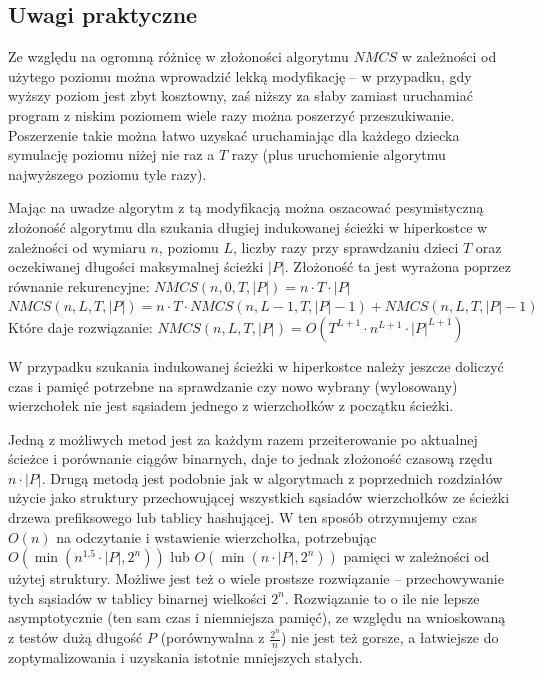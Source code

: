 \documentclass{pracamgr}
\begin{document}
    \subsection{Uwagi praktyczne}
     Ze względu na ogromną różnicę w złożoności algorytmu $NMCS$ w zależności od użytego poziomu można wprowadzić lekką modyfikację -- w przypadku,
     gdy wyższy poziom jest zbyt kosztowny, zaś niższy za słaby zamiast uruchamiać program z niskim poziomem wiele razy można poszerzyć przeszukiwanie.
     Poszerzenie takie można łatwo uzyskać uruchamiając dla każdego dziecka symulację poziomu niżej nie raz a $T$ razy
     (plus uruchomienie algorytmu najwyższego poziomu tyle razy).
     
     Mając na uwadze algorytm z tą modyfikacją można oszacować pesymistyczną złożoność algorytmu dla szukania długiej indukowanej ścieżki w hiperkostce
     w zależności od wymiaru $n$, poziomu $L$, liczby razy przy sprawdzaniu dzieci $T$ oraz oczekiwanej długości maksymalnej ścieżki $|P|$.
     Złożoność ta jest wyrażona poprzez równanie rekurencyjne:\newline
     $NMCS(n,0,T,|P|)=n\cdot T\cdot |P|$\newline
     $NMCS(n,L,T,|P|)=n\cdot T\cdot NMCS(n,L-1,T,|P|-1)+NMCS(n,L,T,|P|-1)$\newline
     Które daje rozwiązanie:\newline
     $NMCS(n,L,T,|P|)=O(T^{L+1}\cdot n^{L+1}\cdot|P|^{L+1})$     
     
     W przypadku szukania indukowanej ścieżki w hiperkostce należy jeszcze doliczyć czas i pamięć potrzebne na sprawdzanie czy nowo wybrany (wylosowany)
     wierzchołek nie jest sąsiadem jednego z wierzchołków z początku ścieżki.
     
     Jedną z możliwych metod jest za każdym razem przeiterowanie po aktualnej ścieżce i porównanie ciągów binarnych, daje to jednak złożoność
     czasową rzędu $n\cdot |P|$. Drugą metodą jest podobnie jak w algorytmach z poprzednich rozdziałów użycie jako struktury przechowującej wszystkich sąsiadów
     wierzchołków ze ścieżki drzewa prefiksowego lub tablicy hashującej. W ten sposób otrzymujemy czas $O(n)$ na odczytanie i wstawienie wierzchołka,
     potrzebując $O(\min(n^{1.5}\cdot|P|,2^n))$ lub $O(\min(n\cdot|P|,2^n))$ pamięci w zależności od użytej struktury.
     Możliwe jest też o wiele prostsze rozwiązanie -- przechowywanie tych sąsiadów w tablicy binarnej wielkości $2^n$.
     Rozwiązanie to o ile nie lepsze asymptotycznie (ten sam czas i niemniejsza pamięć),
     ze względu na wnioskowaną z testów dużą długość $P$ (porównywalna z $\frac{2^n}{n}$) nie jest też gorsze,
     a łatwiejsze do zoptymalizowania i uzyskania istotnie mniejszych stałych.
     
\end{document}

